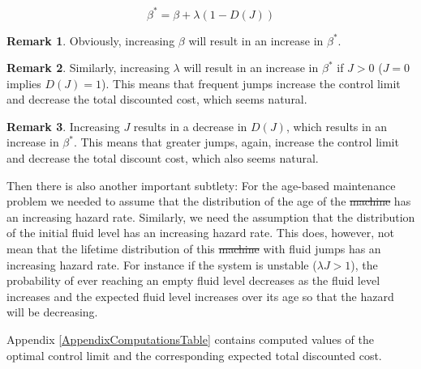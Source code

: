 \documentclass[a4paper]{thesis}
\theoremstyle{definition}
\newtheorem{remark}{Remark}[chapter]
\providecommand{\DIFaddtex}[1]{{\protect\color{blue}\uwave{#1}}} %
\providecommand{\DIFdeltex}[1]{{\protect\color{red}\sout{#1}}}                      %
\providecommand{\DIFaddbegin}{} %
\providecommand{\DIFaddend}{} %
\providecommand{\DIFdelbegin}{} %
\providecommand{\DIFdelend}{} %
\providecommand{\DIFadd}[1]{\texorpdfstring{\DIFaddtex{#1}}{#1}} %
\providecommand{\DIFdel}[1]{\texorpdfstring{\DIFdeltex{#1}}{}} %
\newcommand{\DIFscaledelfig}{0.5}
\newlength{\DIFdelgraphicswidth} %
\newlength{\DIFdelgraphicsheight} %
\newcommand{\DIFaddincludegraphics}[2][]{{\color{blue}\fbox{\DIFOincludegraphics[#1]{#2}}}} %
\newcommand{\DIFdelincludegraphics}[2][]{%
	\sbox{\DIFdelgraphicsbox}{\DIFOincludegraphics[#1]{#2}}%
	\settoboxwidth{\DIFdelgraphicswidth}{\DIFdelgraphicsbox} %
	\settoboxtotalheight{\DIFdelgraphicsheight}{\DIFdelgraphicsbox} %
	\scalebox{\DIFscaledelfig}{%
		\parbox[b]{\DIFdelgraphicswidth}{\usebox{\DIFdelgraphicsbox}\\[-\baselineskip] \rule{\DIFdelgraphicswidth}{0em}}\llap{\resizebox{\DIFdelgraphicswidth}{\DIFdelgraphicsheight}{%
				\setlength{\unitlength}{\DIFdelgraphicswidth}%
				\begin{picture}(1,1)%
				\thicklines\linethickness{2pt} %
				{\color[rgb]{1,0,0}\put(0,0){\framebox(1,1){}}}%
				{\color[rgb]{1,0,0}\put(0,0){\line( 1,1){1}}}%
				{\color[rgb]{1,0,0}\put(0,1){\line(1,-1){1}}}%
				\end{picture}%
			}\hspace*{3pt}}} %
} %
\DeclareRobustCommand{\DIFaddbegin}{\DIFOaddbegin \let\includegraphics\DIFaddincludegraphics} %
\DeclareRobustCommand{\DIFaddend}{\DIFOaddend \let\includegraphics\DIFOincludegraphics} %
\DeclareRobustCommand{\DIFdelbegin}{\DIFOdelbegin \let\includegraphics\DIFdelincludegraphics} %
\DeclareRobustCommand{\DIFdelend}{\DIFOaddend \let\includegraphics\DIFOincludegraphics} %
\begin{document}
	\[
	\beta^*=\beta+\lambda(1-D(J))
	\]
	\begin{remark}
		Obviously, increasing $\beta$ will result in an increase in $\beta^*$.
	\end{remark}
	\begin{remark}
		Similarly, increasing $\lambda$ will result in an increase in $\beta^*$ if $J>0$ ($J=0$ implies $D(J)=1$).
		This means that frequent jumps increase the control limit and decrease the total discounted cost, which seems natural.
	\end{remark}
	\begin{remark}
		Increasing $J$ results in a decrease in $D(J)$, which results in an increase in $\beta^*$.
		This means that greater jumps, again, increase the control limit and decrease the total discount cost, which also seems natural.
	\end{remark}
	Then there is also another important subtlety: For the age-based maintenance problem we needed to assume that the distribution of the age of the \DIFdelbegin \DIFdel{machine }\DIFdelend \DIFaddbegin \DIFadd{asset }\DIFaddend has an increasing hazard rate.
	Similarly, we need the assumption that the distribution of the initial fluid level has an increasing hazard rate.
	This does, however, not mean that the lifetime distribution of this \DIFdelbegin \DIFdel{machine }\DIFdelend \DIFaddbegin \DIFadd{asset }\DIFaddend with fluid jumps has an increasing hazard rate.
	For instance if the system is unstable ($\lambda J>1$), the probability of ever reaching an empty fluid level decreases as the fluid level increases and the expected fluid level increases over its age so that the hazard will be decreasing.
	
	Appendix \ref{AppendixComputationsTable} contains computed values of the optimal control limit and the corresponding expected total discounted cost. 
\end{document}
